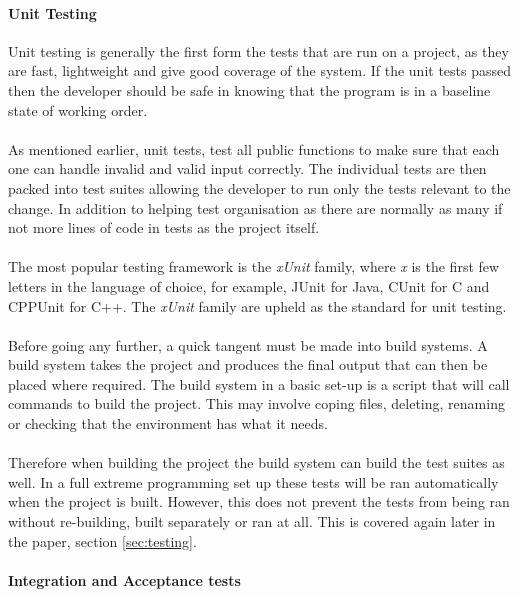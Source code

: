 \paragraph{Unit Testing}
Unit testing is generally the first form the tests that are run on a project, as they are fast, lightweight and give good coverage of the system. If the unit tests passed then the developer should be safe in knowing that the program is in a baseline state of working order. 
\\\\
As mentioned earlier, unit tests, test all public functions to make sure that each one can handle invalid and valid input correctly. The individual tests are then packed into test suites allowing the developer to run only the tests relevant to the change. In addition to helping test organisation as there are normally as many if not more lines of code in tests as the project itself.
\\\\
The most popular testing framework is the \textit{xUnit} family, where \textit{x} is the first few letters in the language of choice, for example, JUnit for Java, CUnit for C and  CPPUnit for C++. The \textit{xUnit} family  are upheld as the standard for unit testing.
\\\\
Before going any further, a quick tangent must be made into build systems. A build system takes the project and produces the final output that can then be placed where required. The build system in a basic set-up is a script that will call commands to build the project. This may involve coping files, deleting, renaming or checking that the environment has what it needs.
\\\\
Therefore when building the project the build system can build the test suites as well. In a full extreme programming set up these tests will be ran automatically when the project is built. However, this does not prevent the tests from being ran without re-building, built separately or ran at all. This is covered again later in the paper, section \ref{sec:testing}.

\paragraph{Integration and Acceptance tests}

